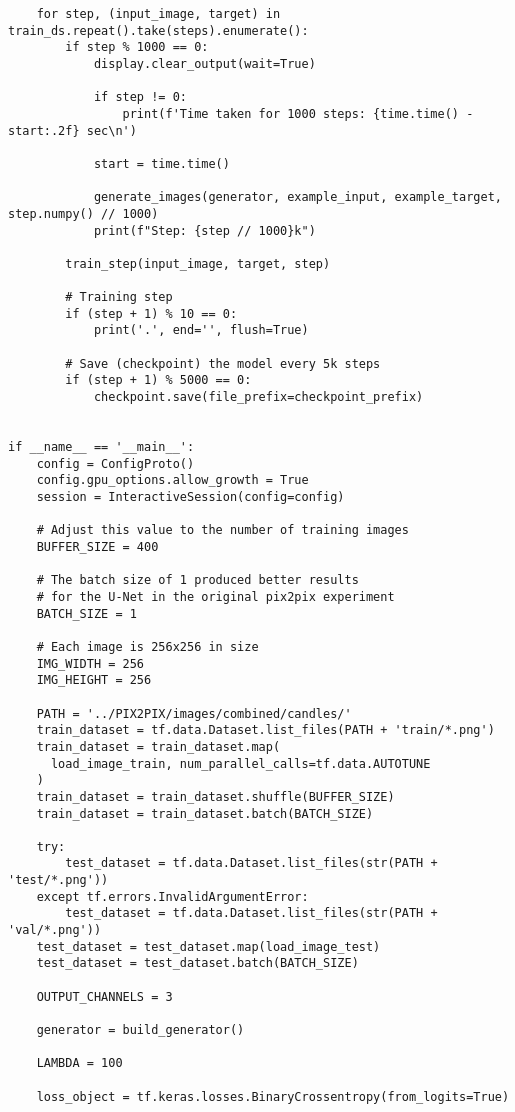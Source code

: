 \begin{lstlisting}
    for step, (input_image, target) in train_ds.repeat().take(steps).enumerate():
        if step % 1000 == 0:
            display.clear_output(wait=True)

            if step != 0:
                print(f'Time taken for 1000 steps: {time.time() - start:.2f} sec\n')

            start = time.time()

            generate_images(generator, example_input, example_target, step.numpy() // 1000)
            print(f"Step: {step // 1000}k")

        train_step(input_image, target, step)

        # Training step
        if (step + 1) % 10 == 0:
            print('.', end='', flush=True)

        # Save (checkpoint) the model every 5k steps
        if (step + 1) % 5000 == 0:
            checkpoint.save(file_prefix=checkpoint_prefix)


if __name__ == '__main__':
    config = ConfigProto()
    config.gpu_options.allow_growth = True
    session = InteractiveSession(config=config)

    # Adjust this value to the number of training images
    BUFFER_SIZE = 400

    # The batch size of 1 produced better results
    # for the U-Net in the original pix2pix experiment
    BATCH_SIZE = 1

    # Each image is 256x256 in size
    IMG_WIDTH = 256
    IMG_HEIGHT = 256

    PATH = '../PIX2PIX/images/combined/candles/'
    train_dataset = tf.data.Dataset.list_files(PATH + 'train/*.png')
    train_dataset = train_dataset.map(
      load_image_train, num_parallel_calls=tf.data.AUTOTUNE
    )
    train_dataset = train_dataset.shuffle(BUFFER_SIZE)
    train_dataset = train_dataset.batch(BATCH_SIZE)

    try:
        test_dataset = tf.data.Dataset.list_files(str(PATH + 'test/*.png'))
    except tf.errors.InvalidArgumentError:
        test_dataset = tf.data.Dataset.list_files(str(PATH + 'val/*.png'))
    test_dataset = test_dataset.map(load_image_test)
    test_dataset = test_dataset.batch(BATCH_SIZE)

    OUTPUT_CHANNELS = 3

    generator = build_generator()

    LAMBDA = 100

    loss_object = tf.keras.losses.BinaryCrossentropy(from_logits=True)


\end{lstlisting}
